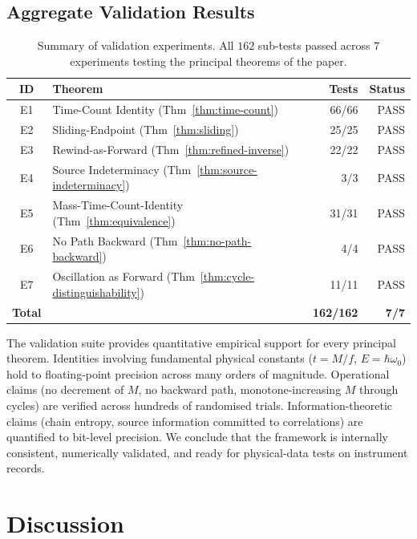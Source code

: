 \documentclass[twocolumn,10pt,a4paper]{article}
\theoremstyle{definition}
\theoremstyle{remark}
\begin{document}
\subsection{Aggregate Validation Results}
\label{sec:val-aggregate}

\begin{table}[H]
\centering
\caption{Summary of validation experiments. All $162$ sub-tests passed across $7$ experiments testing the principal theorems of the paper.}
\label{tab:validation-summary}
\small
\begin{tabular}{cp{}rr}
\toprule
\textbf{ID} & \textbf{Theorem} & \textbf{Tests} & \textbf{Status} \\
\midrule
E1 & Time-Count Identity (Thm~\ref{thm:time-count}) & 66/66 & PASS \\
E2 & Sliding-Endpoint (Thm~\ref{thm:sliding}) & 25/25 & PASS \\
E3 & Rewind-as-Forward (Thm~\ref{thm:refined-inverse}) & 22/22 & PASS \\
E4 & Source Indeterminacy (Thm~\ref{thm:source-indeterminacy}) & 3/3 & PASS \\
E5 & Mass-Time-Count-Identity (Thm~\ref{thm:equivalence}) & 31/31 & PASS \\
E6 & No Path Backward (Thm~\ref{thm:no-path-backward}) & 4/4 & PASS \\
E7 & Oscillation as Forward (Thm~\ref{thm:cycle-distinguishability}) & 11/11 & PASS \\
\midrule
\textbf{Total} & & \textbf{162/162} & \textbf{7/7} \\
\bottomrule
\end{tabular}
\end{table}

The validation suite provides quantitative empirical support for every principal theorem. Identities involving fundamental physical constants ($t = M/f$, $E = \hbar\omega_0$) hold to floating-point precision across many orders of magnitude. Operational claims (no decrement of $M$, no backward path, monotone-increasing $M$ through cycles) are verified across hundreds of randomised trials. Information-theoretic claims (chain entropy, source information committed to correlations) are quantified to bit-level precision. We conclude that the framework is internally consistent, numerically validated, and ready for physical-data tests on instrument records.

\section{Discussion}
\label{sec:discussion}
\end{document}
